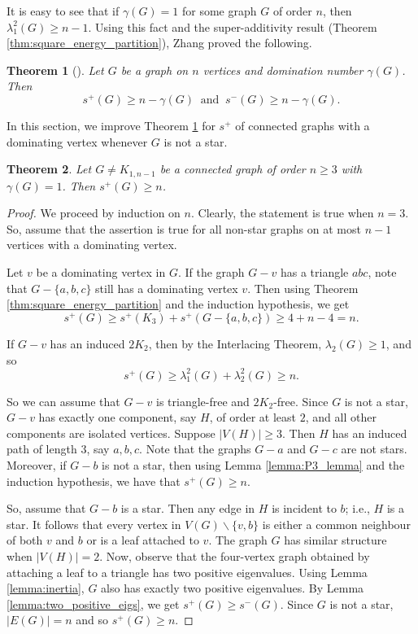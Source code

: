 \documentclass{article}
\newtheorem{theorem}{Theorem}[section]
\begin{document}
It is easy to see that if $\gamma(G)=1$ for some graph $G$ of order $n$, then $\lambda^2_1(G) \geq n-1$. Using this fact and the super-additivity result (Theorem \ref{thm:square_energy_partition}), Zhang \cite{Zhang_2024_Extremal} proved the following.

\begin{theorem}[\cite{Zhang_2024_Extremal}]\label{thm:n-gamma}
    Let $G$ be a graph on $n$ vertices and domination number $\gamma(G)$. Then
    \[s^+(G)\geq n-\gamma(G) \ \text{ and }\  s^-(G)\geq n-\gamma(G).\]
\end{theorem}

In this section, we improve Theorem \ref{thm:n-gamma} for $s^+$ of connected graphs with a dominating vertex whenever $G$ is not a star.

\begin{theorem}\label{thm:domination_splus}
Let $G \neq K_{1,n-1}$ be a connected graph of order $n\ge 3$ with $\gamma(G)=1$. Then $s^+(G)\geq n$.
\end{theorem}

\begin{proof}
We proceed by induction on $n$. Clearly, the statement is true when $n=3$. So, assume that the assertion is true for all non-star graphs on at most $n-1$ vertices with a dominating vertex. 

Let $v$ be a dominating vertex in $G$. If the graph $G-v$ has a triangle $abc$, note that $G-\{a, b, c\}$ still has a dominating vertex $v$. Then using Theorem \ref{thm:square_energy_partition} and the induction hypothesis, we get 
\[s^+(G) \geq s^+(K_3)+ s^+(G-\{a,b,c\}) \geq 4 + n-4 = n.\]

If $G-v$ has an induced $2K_2$, then by the Interlacing Theorem, $\lambda_2(G) \geq 1$, and so 
\[s^+(G) \geq \lambda_1^2(G) + \lambda_2^2(G) \geq n.\]

So we can assume that $G-v$ is triangle-free and $2K_2$-free. Since $G$ is not a star, $G-v$ has exactly one component, say $H$, of order at least $2$, and all other components are isolated vertices. Suppose $|V(H)|\ge 3$. Then $H$ has an induced path of length $3$, say $a,b,c$. Note that the graphs $G-a$ and $G-c$ are not stars. Moreover, if $G-b$ is not a star, then using Lemma \ref{lemma:P3_lemma} and the induction hypothesis, we have that $s^+(G) \geq n$. 

So, assume that $G-b$ is a star. Then any edge in $H$ is incident to $b$; i.e., $H$ is a star. It follows that every vertex in $V(G)\backslash \{v, b\}$ is either a common neighbour of both $v$ and $b$ or is a leaf attached to $v$. The graph $G$ has similar structure when $|V(H)|=2$. Now, observe that the four-vertex graph obtained by attaching a leaf to a triangle has two positive eigenvalues. Using Lemma \ref{lemma:inertia}, $G$ also has exactly two positive eigenvalues. By Lemma \ref{lemma:two_positive_eigs}, we get $s^+(G) \geq s^-(G)$. Since $G$ is not a star, $|E(G)|=n$ and so $s^+(G) \geq n$.
\end{proof}
\end{document}
